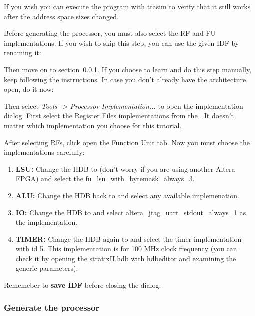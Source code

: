 \documentclass[twoside]{tceusermanual}
\begin{document}

If you wish you can execute the program with ttasim to verify that it
still works after the address space sizes changed.

Before generating the processor, you must also select the RF and FU
implementations. If you wish to skip this step, you can use the given
IDF by renaming it: 


Then move on to section~\ref{tut:fpga_stdout_gen_proc}. If you choose
to learn and do this step manually, keep following the
instructions. In case you don't already have the architecture open, do
it now:


Then select \textit{Tools -> Processor Implementation...} to open the
implementation dialog. First select the Register Files implementations
from the . It doesn't matter which
implementation you choose for this tutorial.

After selecting RFs, click open the Function Unit tab. Now you must
choose the implementations carefully:

\begin{enumerate}
\item%
\textbf{LSU:} Change the HDB to  (don't worry if you are
using another Altera FPGA) and select the
fu\_lsu\_with\_bytemask\_always\_3.

\item%
\textbf{ALU:} Change the HDB back to  and
select any available implemenation.

\item%
\textbf{IO:} Change the HDB to  and select
altera\_jtag\_uart\_stdout\_always\_1 as the implementation.

\item%
\textbf{TIMER:} Change the HDB again to  and select
the timer implementation with id 5. This implementation is for 100 MHz
clock frequency (you can check it by opening the stratixII.hdb with
hdbeditor and examining the generic parameters).
\end{enumerate}

Rememeber to \textbf{save IDF} before closing the dialog.


\subsubsection{Generate the processor}
\label{tut:fpga_stdout_gen_proc}
\end{document}
